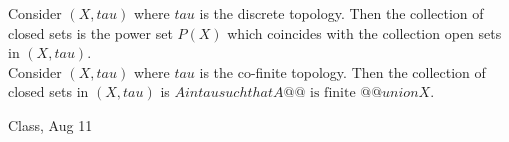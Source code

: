 \begin{samepage}
\begin{ex}
Consider $(X, tau)$ where $tau$ is the discrete topology. Then the collection of closed sets is the power set $P(X)$ which coincides with the collection open sets in $(X, tau)$.\\
Consider $(X, tau)$ where $tau$ is the co-finite topology. Then the collection of closed sets in $(X, tau)$ is $ {{ A in tau such that A @@\text{ is finite }@@ }} union {{ X }} $.
\end{ex}
\begin{source}
Class, Aug 11
\end{source}
\end{samepage}
